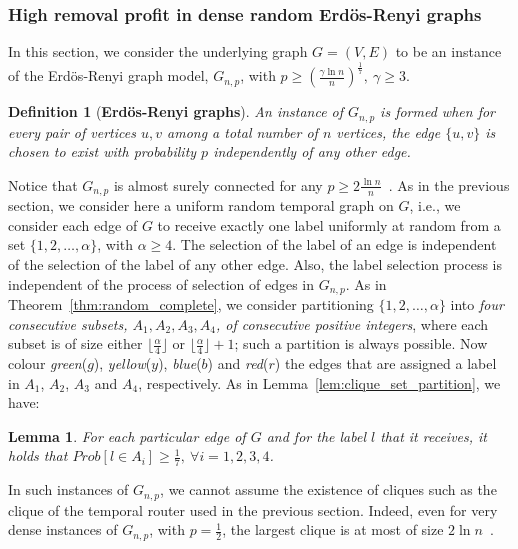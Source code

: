 \documentclass[a4paper,UKenglish]{article}
\newtheorem{definition}{Definition}
\newtheorem{lemma}{Lemma}
\begin{document}
\subsubsection{High removal profit in dense random Erd\"os-Renyi graphs}

In this section, we consider the underlying graph $G=(V,E)$ to be an instance of the Erd\"os-Renyi graph model, $G_{n,p}$, with $p\geq \left( \frac{\gamma \ln{n}}{n} \right)^{\frac{1}{7}},~\gamma \geq 3$.

\begin{definition}[\textbf{Erd\"{o}s-Renyi graphs}]
An instance of $G_{n,p}$ is formed when for every pair of vertices $u,v$ among a total number of $n$ vertices, the edge $\{u,v\}$ is chosen to exist with probability $p$ independently of any other edge.
\end{definition}

Notice that $G_{n,p}$ is almost surely connected for any $p \geq 2 \frac{\ln{n}}{n}$~\cite{bollobasb}. As in the previous section, we consider here a uniform random temporal graph on $G$, i.e., we consider each edge of $G$ to receive exactly one label uniformly at random from a set $\{1,2,\ldots, \alpha\}$, with $\alpha \geq 4$. The selection of the label of an edge is independent of the selection of the label of any other edge. Also, the label selection process is independent of the process of selection of edges in $G_{n,p}$. As in Theorem~\ref{thm:random_complete}, we consider partitioning $\{1,2,\ldots, \alpha\}$ into \emph{four consecutive subsets, $A_1,A_2,A_3,A_4$, of consecutive positive integers}, where each subset is of size either $\lfloor \frac{\alpha}{4} \rfloor$ or $\lfloor \frac{\alpha}{4} \rfloor +1$; such a partition is always possible. Now colour \emph{green}($g$), \emph{yellow}($y$), \emph{blue}($b$) and \emph{red}($r$) the edges that are assigned a label in $A_1$, $A_2$, $A_3$ and $A_4$, respectively. As in Lemma~\ref{lem:clique_set_partition}, we have:
\begin{lemma}
For each particular edge of $G$ and for the label $l$ that it receives, it holds that $Prob[l \in A_i] \geq \frac{1}{7},~ \forall i=1,2,3,4$.
\end{lemma}

In such instances of $G_{n,p}$, we cannot assume the existence of cliques such as the clique of the temporal router used in the previous section. Indeed, even for very dense instances of $G_{n,p}$, with $p=\frac{1}{2}$, the largest clique is at most of size $2\ln{n}$~\cite{bollobasb}.
\end{document}
